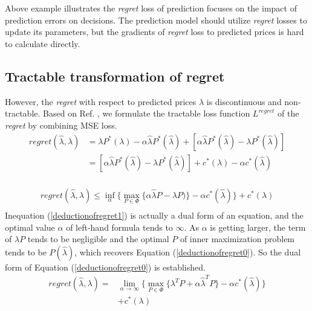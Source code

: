 \documentclass[journal]{IEEEtran}
\begin{document}
Above example illustrates the \textit{regret} loss of prediction focuses on the impact of prediction errors on decisions. The prediction model should utilize \textit{regret} losses to update its parameters, but the gradients of \textit{regret} loss to predicted prices is hard to calculate directly.

\subsection{Tractable transformation of regret}

However, the \textit{regret} with respect to predicted prices $\hat{\lambda}$ is discontinuous and non-tractable. Based on Ref. \cite{Elmachtoub2020}, we formulate the tractable loss function $L^{regret}$ of the \textit{regret} by combining MSE loss.
\begin{equation}
  \label{deductionofregret0}
  \begin{aligned}
    regret(\hat{\lambda}, \lambda) &= \lambda P^*(\lambda) - \alpha \hat{\lambda}P^*(\hat{\lambda}) + [\alpha \hat{\lambda}P^*(\hat{\lambda}) - \lambda P^*(\hat{\lambda})]\\
    &= [\alpha \hat{\lambda}P^*(\hat{\lambda}) - \lambda P^*(\hat{\lambda})] + c^*(\lambda) - \alpha c^*(\hat{\lambda})\\
  \end{aligned}
\end{equation}

\begin{equation}
  \label{deductionofregret1}
  \begin{aligned}
    regret(\hat{\lambda}, \lambda) \leq \inf_{\alpha} \Big\{ 
      \max_{P \in \Phi} \{ 
        \alpha \hat{\lambda}P - \lambda P) \} 
        - \alpha c^*(\hat{\lambda}) \Big\} 
        + c^*(\lambda) \\
  \end{aligned}
\end{equation}
Inequation (\ref{deductionofregret1}) is actually a dual form of an equation, and the optimal value $\alpha$ of left-hand formula tends to $\infty$. As $\alpha$ is getting larger, the term of $\lambda P$ tends to be negligible and the optimal $P$ of inner maximization problem tends to be $P(\hat{\lambda})$, which recovers Equation (\ref{deductionofregret0}). So the dual form of Equation (\ref{deductionofregret0}) is established.
\begin{equation}
  \label{lossofregret1}
  \begin{aligned}
    regret(\hat{\lambda}, \lambda) = & \lim_{\alpha \to \infty } \Big \{ \max_{P \in \Phi} \{\lambda^T P + \alpha \hat{\lambda}^T P \} - \alpha c^*(\hat{\lambda}) \Big\} \\
    & + c^*(\lambda)
  \end{aligned}
\end{equation}
\end{document}
